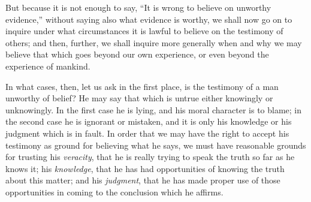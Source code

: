 \documentclass[12pt]{article}
\begin{document}
But because it is not enough to say, ``It is wrong to believe on unworthy evidence,'' without saying also what evidence is worthy, we shall now go on to inquire under what circumstances it is lawful to believe on the testimony of others; and then, further, we shall inquire more generally when and why we may believe that which goes beyond our own experience, or even beyond the experience of mankind.

In what cases, then, let us ask in the first place, is the testimony of a man unworthy of belief? He may say that which is untrue either knowingly or unknowingly. In the first case he is lying, and his moral character is to blame; in the second case he is ignorant or mistaken, and it is only his knowledge or his judgment which is in fault. In order that we may have the right to accept his testimony as ground for believing what he says, we must have reasonable grounds for trusting his \emph{veracity}, that he is really trying to speak the truth so far as he knows it; his \emph{knowledge}, that he has had opportunities of knowing the truth about this matter; and his \emph{judgment}, that he has made proper use of those opportunities in coming to the conclusion which he affirms.
\end{document}
